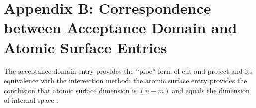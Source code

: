 \section{Appendix B: Correspondence between Acceptance Domain and Atomic Surface Entries}

The acceptance domain entry provides the ``pipe'' form of cut-and-project and its equivalence with the intersection method; the atomic surface entry provides the conclusion that atomic surface dimension is $(n-m)$ and equals the dimension of internal space \cite{IUCRAcceptanceDomain,IUCRAtomicSurface}.
